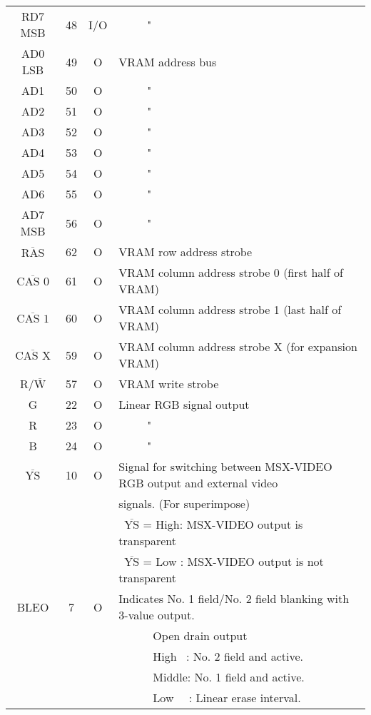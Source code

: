 \documentclass[a4paper,10pt]{article}
\begin{document}
\begin{tabular}{|c|c|c|l|}
RD7 MSB & 48 & I/O & \ \ \ \ \ "\\[-1.04em]
AD0 LSB & 49 & O & VRAM address bus\\[-1.04em]
AD1 & 50 & O & \ \ \ \ \ "\\[-1.04em]
AD2 & 51 & O & \ \ \ \ \ "\\[-1.04em]
AD3 & 52 & O & \ \ \ \ \ "\\[-1.04em]
AD4 & 53 & O & \ \ \ \ \ "\\[-1.04em]
AD5 & 54 & O & \ \ \ \ \ "\\[-1.04em]
AD6 & 55 & O & \ \ \ \ \ "\\[-1.04em]
AD7 MSB & 56 & O & \ \ \ \ \ "\\[-1.04em]
$\overline{\mbox{RAS}}$ & 62 & O & VRAM row address strobe\\[-1.04em]
$\overline{\mbox{CAS 0}}$ & 61 & O & VRAM column address strobe 0 (first half of VRAM)\\[-1.04em]
$\overline{\mbox{CAS 1}}$ & 60 & O & VRAM column address strobe 1 (last half of VRAM)\\[-1.04em]
$\overline{\mbox{CAS X}}$ & 59 & O & VRAM column address strobe X (for expansion VRAM)\\[-1.04em]
R/$\overline{\mbox{W}}$ & 57 & O & VRAM write strobe\\[-1.04em]
G & 22 & O & Linear RGB signal output\\[-1.04em]
R & 23 & O & \ \ \ \ \ "\\[-1.04em]
B & 24 & O & \ \ \ \ \ "\\[-1.04em]
$\overline{\mbox{YS}}$ & 10 & O & Signal for switching between MSX-VIDEO RGB output and external video\\[-1.04em]
& & & signals. (For superimpose)\\[-1.04em]
& & & \ $\overline{\mbox{YS}}$ = High: MSX-VIDEO output is transparent\\[-1.04em]
& & & \ $\overline{\mbox{YS}}$ = Low : MSX-VIDEO output is not transparent\\[-1.04em]
BLEO & 7 & O & Indicates No. 1 field/No. 2 field blanking with 3-value output.\\[-1.04em]
& & & \ \ \ \ \ \ Open drain output\\[-1.04em]
& & & \ \ \ \ \ \ High \ : No. 2 field and active.\\[-1.04em]
& & & \ \ \ \ \ \ Middle: No. 1 field and active.\\[-1.04em]
& & & \ \ \ \ \ \ Low \ \ : Linear erase interval.\\
\hline
\end{tabular}
\end{document}
